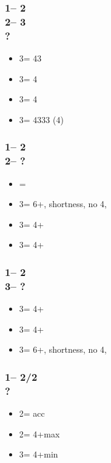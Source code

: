 \documentclass[12pt, a4paper]{report}
\begin{document}
{{        \subsubsection*{1\nt -- 2\clubs\\
                        2\major -- 3\clubs\\
                        ?}
        \begin{itemize}
            \item 3\diams = 43\minor
            \item 3\hearts = 4\clubs
            \item 3\spades = 4\diams
            \item 3\nt = 4333 (4\major)
        \end{itemize}

        \subsubsection*{1\nt -- 2\clubs\\
                        2\nt -- ?}
        \begin{itemize}
            \item \pass = \inv\ \bal
            \item 3\clubs = 6+\diams, \clubs shortness, no 4\major, \gf
            \item 3\diams = 4+\hearts
            \item 3\hearts = 4+\spades
        \end{itemize}

        \subsubsection*{1\nt -- 2\clubs\\
                        3\clubs -- ?}
        \begin{itemize}
            \item 3\diams = 4+\hearts
            \item 3\hearts = 4+\spades
            \item 3\spades = 6+\diams, \clubs shortness, no 4\major, \gf
        \end{itemize}

        \subsubsection*{1\nt -- 2\diams/2\hearts\\
                        ?}
        \begin{itemize}
            \item 2\major = acc
            \item 2\nt = 4+\major max
            \item 3\major = 4+\major min
        \end{itemize}

}}
\end{document}
